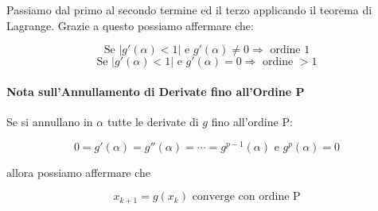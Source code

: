 \documentclass{article}
\begin{document}
Passiamo dal primo al secondo termine ed il terzo applicando il teorema di Lagrange. Grazie a questo possiamo affermare che:

\[ \text{Se } |g'(\alpha) < 1| \text{ e } g'(\alpha) \neq 0 \Rightarrow \text{ ordine 1} \]
\[ \text{Se } |g'(\alpha) < 1| \text{ e } g'(\alpha) = 0 \Rightarrow \text{ ordine } > 1 \]

\paragraph{Nota sull'Annullamento di Derivate fino all'Ordine P} Se si annullano in $\alpha$ tutte le derivate di $g$ fino all'ordine P:

\[ 0 = g'(\alpha) = g''(\alpha) = \cdots = g^{p-1}(\alpha) \text{ e } g^{p}(\alpha) = 0 \]

allora possiamo affermare che

\[ x_{k+1} = g(x_{k}) \text{ converge con ordine P} \]

\newpage
\end{document}
